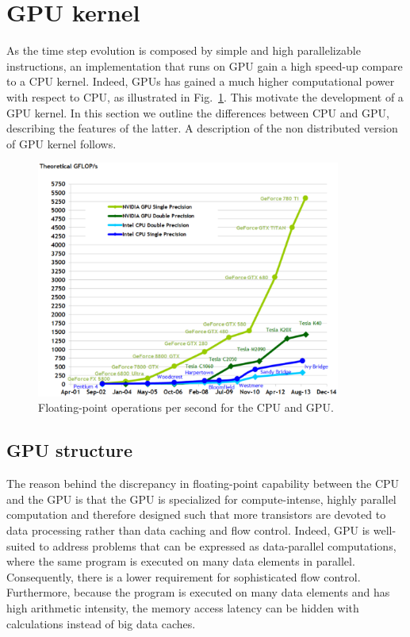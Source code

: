 \section{GPU kernel}
As the time step evolution is composed by simple and high parallelizable instructions, an implementation that runs on GPU gain a high speed-up compare to a CPU kernel. Indeed, GPUs has gained a much higher computational power with respect to CPU, as illustrated in Fig.~\ref{fig:CPU-GPU-computational-power}. This motivate the development of a GPU kernel. In this section we outline the differences between CPU and GPU, describing the features of the latter. A description of the non distributed version of GPU kernel follows.
\begin{figure}
   \centering
   \includegraphics[width=10cm]{Figs/CPU-GPU_computational_power.eps}
   \caption{Floating-point operations per second for the CPU and GPU.} \label{fig:CPU-GPU-computational-power}
\end{figure}

\subsection{GPU structure}
The reason behind the discrepancy in floating-point capability between the CPU and the GPU is that the GPU is specialized for compute-intense, highly parallel computation and therefore designed such that more transistors are devoted to data processing rather than data caching and flow control. Indeed, GPU is well-suited to address problems that can be expressed as data-parallel computations, where the same program is executed on many data elements in parallel. Consequently, there is a lower requirement for sophisticated flow control. Furthermore, because the program is executed on many data elements and has high arithmetic intensity, the memory access latency can be hidden with calculations instead of big data caches.


